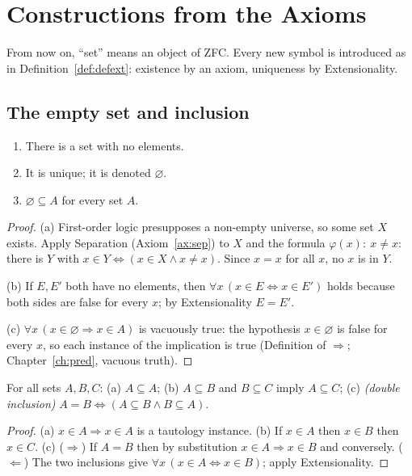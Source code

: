 \chapter{Constructions from the Axioms}\label{ch:fromaxioms}

From now on, ``set'' means an object of ZFC. Every new symbol is introduced as in Definition~\ref{def:defext}: existence by an axiom, uniqueness by Extensionality.

\section{The empty set and inclusion}

\begin{theorem}\label{thm:empty}
	\begin{enumerate}[label=(\alph*)]
		\item There is a set with no elements.
		\item It is unique; it is denoted $\varnothing$.
		\item $\varnothing\subseteq A$ for every set $A$.
	\end{enumerate}
\end{theorem}
\begin{proof}
	(a) First-order logic presupposes a non-empty universe, so some set $X$ exists. Apply Separation (Axiom~\ref{ax:sep}) to $X$ and the formula $\varphi(x):\ x\neq x$: there is $Y$ with $x\in Y\Leftrightarrow(x\in X\wedge x\ne x)$. Since $x=x$ for all $x$, no $x$ is in $Y$.
	
	(b) If $E,E'$ both have no elements, then $\forall x\,(x\in E\Leftrightarrow x\in E')$ holds because both sides are false for every $x$; by Extensionality $E=E'$.
	
	(c) $\forall x\,(x\in\varnothing\Rightarrow x\in A)$ is vacuously true: the hypothesis $x\in\varnothing$ is false for every $x$, so each instance of the implication is true (Definition of $\Rightarrow$; Chapter~\ref{ch:pred}, vacuous truth).
\end{proof}

\begin{proposition}\label{prop:subset}
	For all sets $A,B,C$: (a) $A\subseteq A$; (b) $A\subseteq B$ and $B\subseteq C$ imply $A\subseteq C$; (c) \emph{(double inclusion)} $A=B\iff(A\subseteq B\wedge B\subseteq A)$.
\end{proposition}
\begin{proof}
	(a) $x\in A\Rightarrow x\in A$ is a tautology instance. (b) If $x\in A$ then $x\in B$ then $x\in C$. (c) ($\Rightarrow$) If $A=B$ then by substitution $x\in A\Rightarrow x\in B$ and conversely. ($\Leftarrow$) The two inclusions give $\forall x\,(x\in A\Leftrightarrow x\in B)$; apply Extensionality.
\end{proof}

